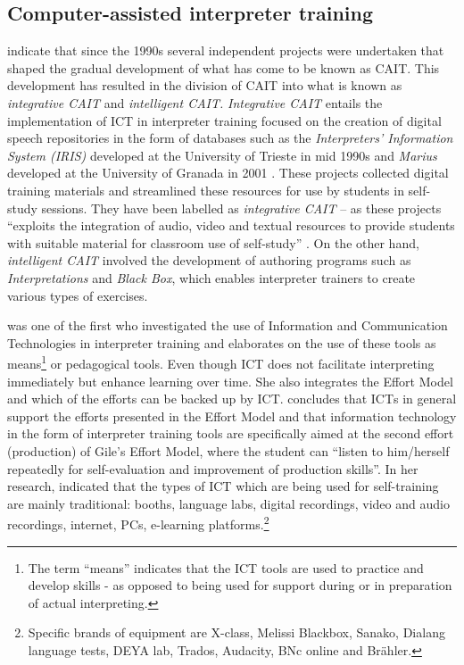 \documentclass[output=paper]{langsci/langscibook}
\begin{document}
\subsection{Computer-assisted interpreter training}
\citet{Sandrelli2007a} indicate that since the 1990s several independent projects were undertaken that shaped the gradual development of what has come to be known as \textsc{CAIT}. This development has resulted in the division of \textsc{CAIT} into what is known as \textit{integrative \textsc{CAIT}} and \textit{intelligent \textsc{CAIT}.} \textit{Integrative \textsc{CAIT}} entails the  implementation of \textsc{ICT} in interpreter training focused on the creation of digital speech repositories in the form of databases such as the \textit{Interpreters’ Information System (IRIS)} developed at the University of Trieste in mid 1990s \citep{Carabelli1997} and \textit{Marius} developed at the University of Granada in 2001 \citep{Pöchhacker1994}. These projects collected digital training materials and streamlined these resources for use by students in self-study sessions. They have been labelled as \textit{integrative \textsc{CAIT}} – as these projects “exploits the integration of audio, video and textual resources to provide students with suitable material for classroom use of self-study” \citep[277]{Sandrelli2007a}. On the other hand, \textit{intelligent \textsc{CAIT}} involved the development of authoring programs such as \textit{Interpretations} and \textit{Black Box}, which enables interpreter trainers to create various types of exercises. 

\citet[229]{Berber2010} was one of the first who investigated the use of Information and Communication Technologies in interpreter training and elaborates on the use of these tools as means\footnote{The term “means” indicates that the \textsc{ICT} tools are used to practice and develop skills - as opposed to being used for support during or in preparation of actual interpreting.} or pedagogical tools. Even though \textsc{ICT} does not facilitate interpreting immediately but enhance learning over time. She also integrates the Effort Model \citep{Gile1995} and which of the efforts can be backed up by \textsc{ICT}. \citet[237]{Berber2010} concludes that \textsc{ICT}s in general support the efforts presented in the Effort Model and that information technology in the form of interpreter training tools are specifically aimed at the second effort (production) of Gile’s Effort Model, where the student can “listen to him/herself repeatedly for self-evaluation and improvement of production skills”. In her research, \citet[243]{Berber2010} indicated that the types of \textsc{ICT} which are being used for self-training are mainly traditional: booths, language labs, digital recordings, video and audio recordings, internet, PCs, e-learning platforms.\footnote{Specific brands of equipment are X-class, Melissi Blackbox, Sanako, Dialang language tests, DEYA lab, Trados, Audacity, BNc online and Brähler.}
\end{document}

